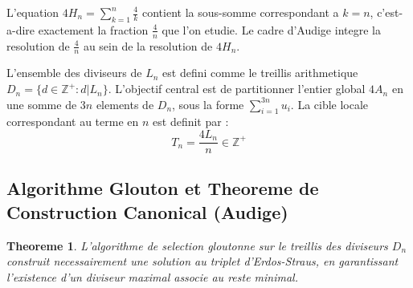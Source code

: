 \documentclass[11pt,a4paper]{article}
\newtheorem{theorem}{Theoreme}[section]
\begin{document}
L'equation $4 H_n = \sum_{k=1}^n \frac{4}{k}$ contient la sous-somme correspondant a $k=n$, c'est-a-dire exactement la fraction $\frac{4}{n}$ que l'on etudie. Le cadre d'Audige integre la resolution de $\frac{4}{n}$ au sein de la resolution de $4 H_n$.

L'ensemble des diviseurs de $L_n$ est defini comme le treillis arithmetique $D_n = \{d \in \mathbb{Z}^{+} : d | L_n\}$.
L'objectif central est de partitionner l'entier global $4 A_n$ en une somme de $3n$ elements de $D_n$, sous la forme $\sum_{i=1}^{3n} u_i$.
La cible locale correspondant au terme en $n$ est definit par :
$$ T_n = \frac{4 L_n}{n} \in \mathbb{Z}^{+} $$

\subsection{Algorithme Glouton et Theoreme de Construction Canonical (Audige)}

\begin{theorem}
L'algorithme de selection gloutonne sur le treillis des diviseurs $D_n$ construit necessairement une solution au triplet d'Erdos-Straus, en garantissant l'existence d'un diviseur maximal associe au reste minimal.
\end{theorem}
\end{document}

